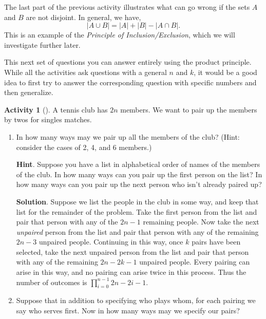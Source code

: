 \documentclass[10pt,]{book}
\theoremstyle{plain}
\theoremstyle{definition}
\theoremstyle{definition}
\theoremstyle{definition}
\newtheorem{activity}[project]{Activity}
\numberwithin{equation}{chapter}
\newcommand{\card}[1]{\left| #1 \right|}
\begin{document}
\hypertarget{p-634}{}%
The last part of the previous activity illustrates what can go wrong if the sets \(A\) and \(B\) are not disjoint.  In general, we have,%
\begin{equation*}
\card{A \cup B} = \card{A} + \card{B} - \card{A \cap B}.
\end{equation*}
This is an example of the \emph{Principle of Inclusion/Exclusion}, which we will investigate further later.%
\par
\hypertarget{p-635}{}%
This next set of questions you can answer entirely using the product principle.  While all the activities ask questions with a general \(n\) and \(k\), it would be a good idea to first try to answer the corresponding question with specific numbers and then generalize.%
\begin{activity}[]\label{tennispairings1}
\hypertarget{p-636}{}%
A tennis club has \(2n\) members. We want to pair up the members by twos for singles matches.%
\begin{enumerate}[font=\bfseries,label=(\alph*),ref=\alph*]
\item\label{task-131} \hypertarget{p-637}{}%
In how many ways may we pair up all the members of the club? (Hint: consider the cases of 2, 4, and 6 members.)%
\par\smallskip%
\noindent\textbf{Hint}.\hypertarget{hint-40}{}\quad%
\hypertarget{p-638}{}%
Suppose you have a list in alphabetical order of names of the members of the club. In how many ways can you pair up the first person on the list? In how many ways can you pair up the next person who isn't already paired up?%
\par\smallskip%
\noindent\textbf{Solution}.\hypertarget{solution-37}{}\quad%
\hypertarget{p-639}{}%
Suppose we list the people in the club in some way, and keep that list for the remainder of the problem. Take the first person from the list and pair that person with any of the \(2n-1\) remaining people. Now take the next \emph{unpaired} person from the list and pair that person with any of the remaining \(2n-3\) unpaired people. Continuing in this way, once \(k\) pairs have been selected, take the next unpaired person from the list and pair that person with any of the remaining \(2n-2k-1\) unpaired people. Every pairing can arise in this way, and no pairing can arise twice in this process. Thus the number of outcomes is \(\prod_{i=0}^{n-1} 2n-2i-1\).%
\item\label{task-132} \hypertarget{p-640}{}%
Suppose that in addition to specifying who plays whom, for each pairing we say who serves first.  Now in how many ways may we specify our pairs?%
\end{enumerate}
\end{activity}
\end{document}
